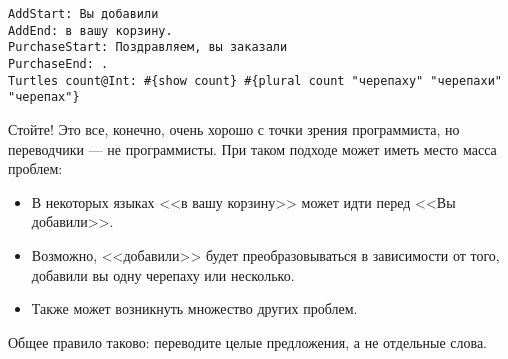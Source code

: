 \begin{lstlisting}
AddStart: Вы добавили
AddEnd: в вашу корзину.
PurchaseStart: Поздравляем, вы заказали
PurchaseEnd: .
Turtles count@Int: #{show count} #{plural count "черепаху" "черепахи" "черепах"}
\end{lstlisting}

Стойте! Это все, конечно, очень хорошо с точки зрения программиста, но переводчики --- не программисты. При таком подходе может иметь место масса проблем:

\begin{itemize}
  \item В некоторых языках <<в вашу корзину>> может идти перед <<Вы добавили>>.
  \item Возможно, <<добавили>> будет преобразовываться в зависимости от того, добавили вы одну черепаху или несколько.
  \item Также может возникнуть множество других проблем. %
\end{itemize}

Общее правило таково: переводите целые предложения, а не отдельные слова.
